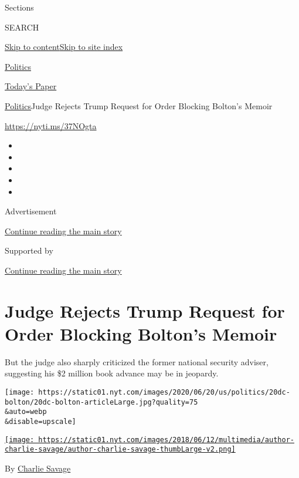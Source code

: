 Sections

SEARCH

\protect\hyperlink{site-content}{Skip to
content}\protect\hyperlink{site-index}{Skip to site index}

\href{https://www.nytimes.com/section/politics}{Politics}

\href{https://myaccount.nytimes.com/auth/login?response_type=cookie\&client_id=vi}{}

\href{https://www.nytimes.com/section/todayspaper}{Today's Paper}

\href{/section/politics}{Politics}\textbar{}Judge Rejects Trump Request
for Order Blocking Bolton's Memoir

\url{https://nyti.ms/37NOgta}

\begin{itemize}
\item
\item
\item
\item
\item
\end{itemize}

Advertisement

\protect\hyperlink{after-top}{Continue reading the main story}

Supported by

\protect\hyperlink{after-sponsor}{Continue reading the main story}

\hypertarget{judge-rejects-trump-request-for-order-blocking-boltons-memoir}{%
\section{Judge Rejects Trump Request for Order Blocking Bolton's
Memoir}\label{judge-rejects-trump-request-for-order-blocking-boltons-memoir}}

But the judge also sharply criticized the former national security
adviser, suggesting his \$2 million book advance may be in jeopardy.

\texttt{[image: https://static01.nyt.com/images/2020/06/20/us/politics/20dc-bolton/20dc-bolton-articleLarge.jpg?quality=75\\\&auto=webp\\\&disable=upscale]}

\href{https://www.nytimes.com/by/charlie-savage}{\texttt{[image: https://static01.nyt.com/images/2018/06/12/multimedia/author-charlie-savage/author-charlie-savage-thumbLarge-v2.png]}}

By \href{https://www.nytimes.com/by/charlie-savage}{Charlie Savage}

